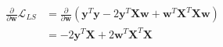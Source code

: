 \newcommand{\matrix}[1]{\mathbf{#1}}
\newcommand{\vector}[1]{\mathbf{#1}}
\newcommand{\X}{\matrix{X}}
\newcommand{\y}{\vector{y}}
\newcommand{\w}{\vector{w}}
\begin{align*}
\frac{\partial}{\partial \w} \mathcal{L}_{LS} &= \frac{\partial}{\partial \w} \left( \y^T\y - 2\y^T\X\w + \w^T\X^T\X\w \right) \\
&= - 2\y^T\X + 2\w^T\X^T\X \\
\end{align*}
